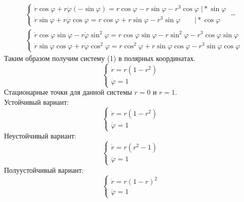 \begin{align}
  &\begin{cases}
    \dot{r}\cos{\varphi}+r\dot{\varphi}(-\sin{\varphi})=r\cos{\varphi}-r\sin{\varphi}-r^3\cos{\varphi}\;\big|*\sin{\varphi}\\
    \dot{r}\sin{\varphi}+r\dot{\varphi}\cos{\varphi}=r\cos{\varphi}+r\sin{\varphi}-r^3\sin{\varphi}\quad\quad\big|*\cos{\varphi}
  \end{cases}-\\
  &\begin{cases}
    \dot{r}\cos{\varphi}\sin{\varphi}-r\dot{\varphi}\sin^2{\varphi}=
    r\cos{\varphi}\sin{\varphi}-r\sin^2{\varphi}-r^3\cos{\varphi}\sin{\varphi}\\
    \dot{r}\sin{\varphi}\cos{\varphi}+r\dot{\varphi}\cos^2{\varphi}=
    r\cos^2{\varphi}+r\sin{\varphi}\cos{\varphi}-r^3\sin{\varphi}\cos{\varphi}
  \end{cases}
\end{align}
Таким образом получим систему (1) в полярных координатах.
\begin{equation}
  \begin{cases}
    \dot{r}=r(1-r^2)\\
    \dot{\varphi}=1
  \end{cases}
\end{equation}
Стационарные точки для данной системы $r=0$ и $r=1$.\\
Устойчивый вариант:
\begin{equation}
  \begin{cases}
    \dot{r}=r(1-r^2)\\
    \dot{\varphi}=1
  \end{cases}
\end{equation}
Неустойчивый вариант:
\begin{equation}
  \begin{cases}
    \dot{r}=r(r^2-1)\\
    \dot{\varphi}=1
  \end{cases}
\end{equation}
Полуустойчивый вариант:
\begin{equation}
  \begin{cases}
    \dot{r}=r(1-r)^2\\
    \dot{\varphi}=1
  \end{cases}
\end{equation}
% 
